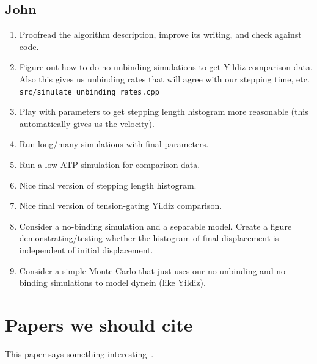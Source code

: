\documentclass[9pt,twocolumn,twoside]{pnas-new}
\begin{document}
\subsection{John}
\begin{enumerate}
\item Proofread the algorithm description, improve its writing, and
  check against code.
\item Figure out how to do no-unbinding simulations to get Yildiz
  comparison data.  Also this gives us unbinding rates that will agree
  with our stepping time, etc. \verb!src/simulate_unbinding_rates.cpp!
\item Play with parameters to get stepping length histogram more
  reasonable (this automatically gives us the velocity).
\item Run long/many simulations with final parameters.
\item Run a low-ATP simulation for comparison data.
\item Nice final version of stepping length histogram.
\item Nice final version of tension-gating Yildiz comparison.
\item Consider a no-binding simulation and a separable model.  Create
  a figure demonstrating/testing whether the histogram of final
  displacement is independent of initial displacement.
\item Consider a simple Monte Carlo that just uses our no-unbinding
  and no-binding simulations to model dynein (like Yildiz).
\end{enumerate}

\section{Papers we should cite}
This paper says something interesting~\cite{leschziner}.

\pnasbreak


\end{document}
